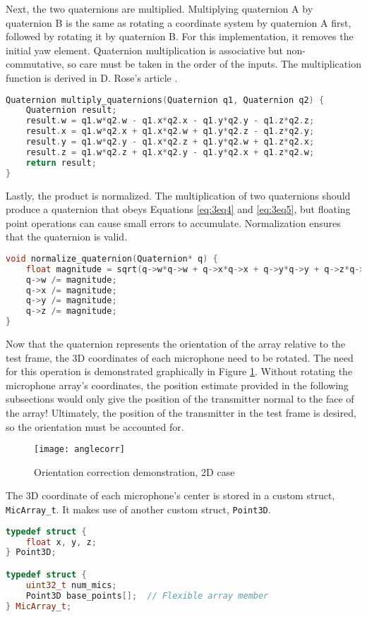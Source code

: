 \documentclass[12pt,a4paper]{report}
\begin{document}
Next, the two quaternions are multiplied. Multiplying quaternion A by quaternion B is the same as rotating a coordinate system by quaternion A first, followed by rotating it by quaternion B. For this implementation, it removes the initial yaw element. Quaternion multiplication is associative but non-commutative, so care must be taken in the order of the inputs. The multiplication function is derived in D. Rose’s article \cite{quaternionuse}.

\begin{lstlisting}[language=C++]
Quaternion multiply_quaternions(Quaternion q1, Quaternion q2) {
	Quaternion result;
	result.w = q1.w*q2.w - q1.x*q2.x - q1.y*q2.y - q1.z*q2.z;
	result.x = q1.w*q2.x + q1.x*q2.w + q1.y*q2.z - q1.z*q2.y;
	result.y = q1.w*q2.y - q1.x*q2.z + q1.y*q2.w + q1.z*q2.x;
	result.z = q1.w*q2.z + q1.x*q2.y - q1.y*q2.x + q1.z*q2.w;
	return result;
}
\end{lstlisting}

Lastly, the product is normalized. The multiplication of two quaternions should produce a quaternion that obeys Equations \ref{eq:3eq4} and \ref{eq:3eq5}, but floating point operations can cause small errors to accumulate. Normalization ensures that the quaternion is valid.

\begin{lstlisting}[language=C++]
void normalize_quaternion(Quaternion* q) {
	float magnitude = sqrt(q->w*q->w + q->x*q->x + q->y*q->y + q->z*q->z);
	q->w /= magnitude;
	q->x /= magnitude;
	q->y /= magnitude;
	q->z /= magnitude;
}
\end{lstlisting}

Now that the quaternion represents the orientation of the array relative to the test frame, the 3D coordinates of each microphone need to be rotated. The need for this operation is demonstrated graphically in Figure \ref{fig:anglecorr}. Without rotating the microphone array’s coordinates, the position estimate provided in the following subsections would only give the position of the transmitter normal to the face of the array! Ultimately, the position of the transmitter in the test frame is desired, so the orientation must be accounted for.

\begin{figure}[htbp]
	\centering
	\texttt{[image: anglecorr]}
	\caption{Orientation correction demonstration, 2D case}
	\label{fig:anglecorr}
\end{figure}

The 3D coordinate of each microphone’s center is stored in a custom struct, \verb|MicArray_t|. It makes use of another custom struct, \verb|Point3D|.
\begin{lstlisting}[language=C++]
typedef struct {
	float x, y, z;
} Point3D;

typedef struct {
	uint32_t num_mics;
	Point3D base_points[];  // Flexible array member
} MicArray_t;
\end{lstlisting}
\end{document}
